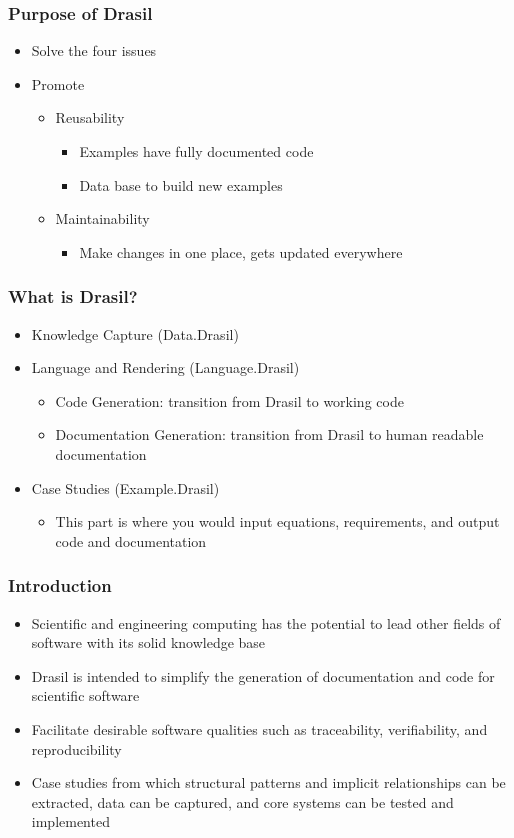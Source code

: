 \documentclass{beamer}
\begin{document}
\begin{frame}
\frametitle{Purpose of Drasil}
\begin{itemize}
  \item Solve the four issues
  \item Promote 
    \begin{itemize}
      \item Reusability 
        \begin{itemize}
          \item Examples have fully documented code
          \item Data base to build new examples
        \end{itemize}
      \item Maintainability
        \begin{itemize}
          \item Make changes in one place, gets updated everywhere
        \end{itemize}
    \end{itemize}
\end{itemize}
\end{frame}

\begin{frame}
\frametitle{What is Drasil?}
\begin{itemize}
  \item<1-> Knowledge Capture (Data.Drasil)
  \item<2-> Language and Rendering (Language.Drasil)
    \begin{itemize}
      \item Code Generation: transition from Drasil to working code
      \item Documentation Generation: transition from Drasil to human readable documentation
    \end{itemize}
  \item<3-> Case Studies (Example.Drasil)
    \begin{itemize}
      \item This part is where you would input equations, requirements, and output code and documentation
    \end{itemize}
\end{itemize}
\end{frame}

\begin{frame}
\frametitle{Introduction}
\begin{itemize}
 \item<1-> Scientific and engineering computing has the potential to lead other fields of software with its solid knowledge base
 \item<2-> Drasil is intended to simplify the generation of documentation and code for scientific software
 \item<3-> Facilitate desirable software qualities such as traceability, verifiability, and reproducibility
 \item<4-> Case studies from which structural patterns and implicit relationships can be extracted, data can be captured, and core systems can be tested and implemented
\end{itemize}
\end{frame}
\end{document}
